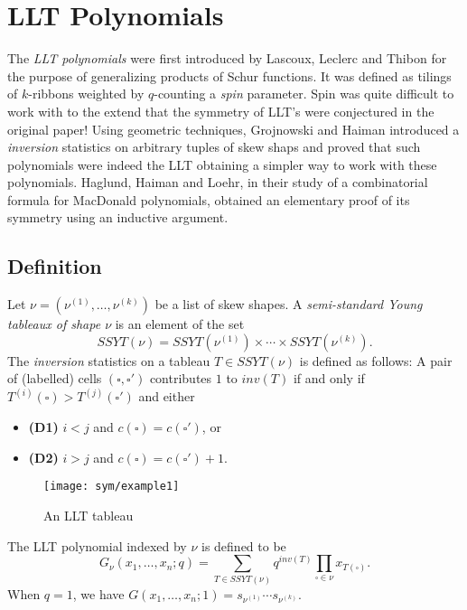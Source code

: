 \section{LLT Polynomials}
\label{sec:llt}

The \textit{LLT polynomials} were first introduced by Lascoux, Leclerc
and Thibon for the purpose of generalizing products of Schur
functions.  It was defined as tilings of $k$-ribbons weighted by
$q$-counting a \textit{spin} parameter.  Spin was quite difficult to
work with to the extend that the symmetry of LLT's were conjectured in
the original paper!  Using geometric techniques, Grojnowski and Haiman
introduced a \textit{inversion} statistics on arbitrary tuples of skew
shaps and proved that such polynomials were indeed the LLT obtaining a
simpler way to work with these polynomials.  Haglund, Haiman and
Loehr, in their study of a combinatorial formula for MacDonald
polynomials, obtained an elementary proof of its symmetry using an
inductive argument.

\subsection{Definition}
\label{sec:definition}

Let $\nu = (\nu^{(1)}, \dots, \nu^{(k)})$ be a list of skew shapes.  A
\textit{semi-standard Young tableaux of shape $\nu$} is an element of
the set
\[
  SSYT(\nu) = SSYT(\nu^{(1)}) \times \cdots \times SSYT(\nu^{(k)}).
\]
The \textit{inversion} statistics on a tableau $T \in SSYT(\nu)$ is
defined as follows: A pair of (labelled) cells $(\square,\square')$ contributes
$1$ to $inv(T)$ if and only if $T^{(i)}(\square) > T^{(j)}(\square')$ and either
\begin{itemize}
\item \textbf{(D1)} $i < j$ and $c(\square) = c(\square')$, or
\item \textbf{(D2)} $i > j$ and $c(\square) = c(\square') + 1$.
\end{itemize}

\begin{figure}[H]
  \centering
  \texttt{[image: sym/example1]}
  \caption{An LLT tableau}
\end{figure}

The LLT polynomial indexed by $\nu$ is defined to be
\[
  G_{\nu}(x_{1},\dots,x_{n};q) = \sum_{T \in SSYT(\nu)} q^{inv(T)} \prod_{\square \in \nu}
  x_{T(\square)}.
\]
When $q=1$, we have $G(x_{1}, \dots, x_{n}; 1) = s_{\nu^{(1)}} \cdots s_{\nu^{(k)}}$.

